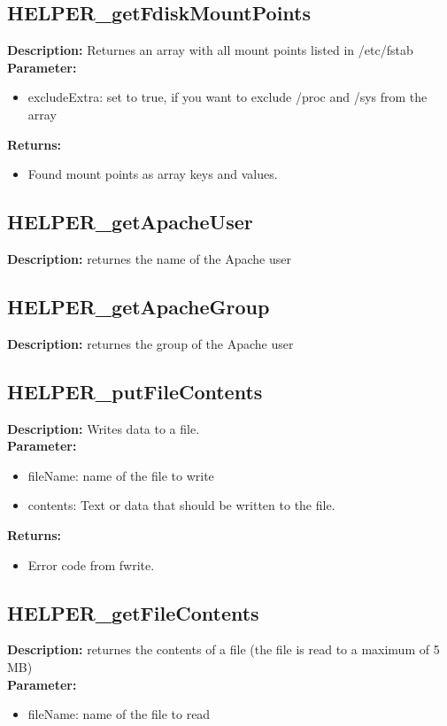 \subsection{HELPER\_getFdiskMountPoints}
\textbf{Description:} Returnes an array with all mount points listed in /etc/fstab\\
\textbf{Parameter:}
\begin{itemize}
\item excludeExtra: set to true, if you want to exclude /proc and /sys from the array
\end{itemize}
\textbf{Returns:}
\begin{itemize}
\item Found mount points as array keys and values.
\end{itemize}

\subsection{HELPER\_getApacheUser}
\textbf{Description:} returnes the name of the Apache user\\

\subsection{HELPER\_getApacheGroup}
\textbf{Description:} returnes the group of the Apache user\\

\subsection{HELPER\_putFileContents}
\textbf{Description:} Writes data to a file.\\
\textbf{Parameter:}
\begin{itemize}
\item fileName: name of the file to write
\item contents: Text or data that should be written to the file.
\end{itemize}
\textbf{Returns:}
\begin{itemize}
\item Error code from fwrite.
\end{itemize}

\subsection{HELPER\_getFileContents}
\textbf{Description:} returnes the contents of a file (the file is read to a maximum of 5 MB)\\
\textbf{Parameter:}
\begin{itemize}
\item fileName: name of the file to read
\end{itemize}

